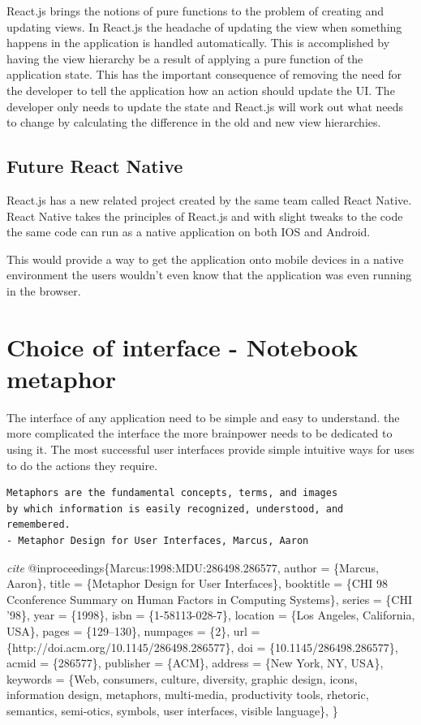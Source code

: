 React.js brings the notions of pure functions to the problem of creating
and updating views. In React.js the headache of updating the view when
something happens in the application is handled automatically. This is
accomplished by having the view hierarchy be a result of applying a pure
function of the application state. This has the important consequence of
removing the need for the developer to tell the application how an
action should update the UI. The developer only needs to update the
state and React.js will work out what needs to change by calculating the
difference in the old and new view hierarchies.

\subsection{Future React Native}\label{future-react-native}

React.js has a new related project created by the same team called React
Native. React Native takes the principles of React.js and with slight
tweaks to the code the same code can run as a native application on both
IOS and Android.

This would provide a way to get the application onto mobile devices in a
native environment the users wouldn't even know that the application was
even running in the browser.

\section{Choice of interface - Notebook
metaphor}\label{choice-of-interface---notebook-metaphor}

The interface of any application need to be simple and easy to
understand. the more complicated the interface the more brainpower needs
to be dedicated to using it. The most successful user interfaces provide
simple intuitive ways for uses to do the actions they require.

\begin{verbatim}
Metaphors are the fundamental concepts, terms, and images
by which information is easily recognized, understood, and
remembered.
- Metaphor Design for User Interfaces, Marcus, Aaron
\end{verbatim}

\emph{cite} @inproceedings\{Marcus:1998:MDU:286498.286577, author =
\{Marcus, Aaron\}, title = \{Metaphor Design for User Interfaces\},
booktitle = \{CHI 98 Cconference Summary on Human Factors in Computing
Systems\}, series = \{CHI '98\}, year = \{1998\}, isbn =
\{1-58113-028-7\}, location = \{Los Angeles, California, USA\}, pages =
\{129--130\}, numpages = \{2\}, url =
\{http://doi.acm.org/10.1145/286498.286577\}, doi =
\{10.1145/286498.286577\}, acmid = \{286577\}, publisher = \{ACM\},
address = \{New York, NY, USA\}, keywords = \{Web, consumers, culture,
diversity, graphic design, icons, information design, metaphors,
multi-media, productivity tools, rhetoric, semantics, semi-otics,
symbols, user interfaces, visible language\}, \}

